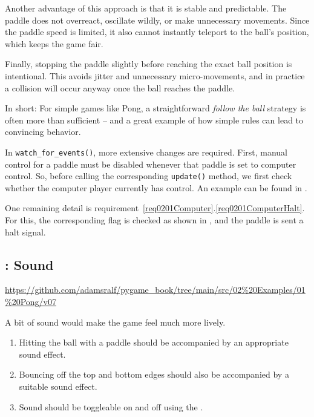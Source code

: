 Another advantage of this approach is that it is stable and predictable. The paddle does not overreact, oscillate wildly, or make unnecessary movements. Since the paddle speed is limited, it also cannot instantly teleport to the ball’s position, which keeps the game fair.

Finally, stopping the paddle slightly before reaching the exact ball position is intentional. This avoids jitter and unnecessary micro-movements, and in practice a collision will occur anyway once the ball reaches the paddle.

In short: For simple games like Pong, a straightforward \emph{follow the ball} strategy is often more than sufficient -- and a great example of how simple rules can lead to convincing behavior.
 

In \texttt{watch\_for\_events()}, more extensive changes are required. First, manual control for a paddle must be disabled whenever that paddle is set to computer control. So, before calling the corresponding \texttt{update()} method, we first check whether the computer player currently has control. An example can be found in .


One remaining detail is requirement~\ref{req0201Computer}.\ref{req0201ComputerHalt}. For this, the corresponding flag is checked as shown in , and the paddle is sent a halt signal.


\subsection{: Sound}
\begin{diskbox}
	\url{https://github.com/adamsralf/pygame_book/tree/main/src/02%20Examples/01%20Pong/v07}
\end{diskbox}
A bit of sound would make the game feel much more lively.

\begin{enumerate}
	\item Hitting the ball with a paddle should be accompanied by an appropriate sound effect.\label{req0201Sound1}
	
	\item Bouncing off the top and bottom edges should also be accompanied by a suitable sound effect.\label{req0201Sound2}
	
	\item Sound should be toggleable on and off using the .\label{req0201Sound3}
\end{enumerate}
\er

